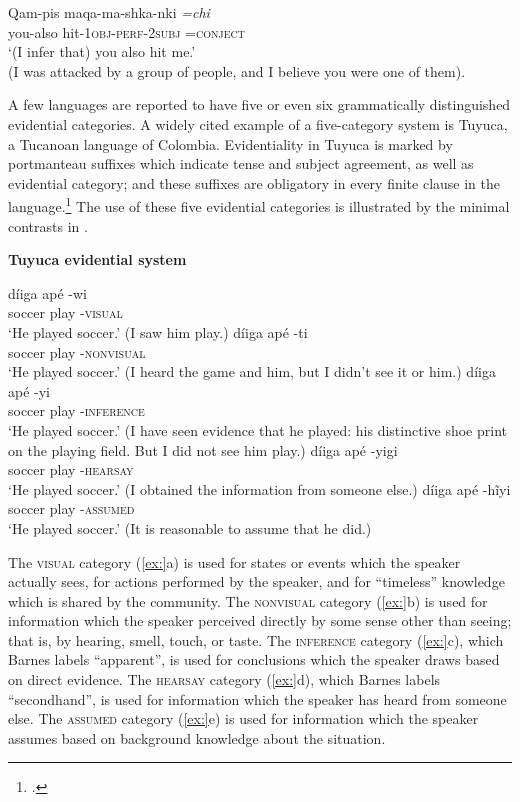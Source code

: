  \ex \gll Qam-pis  maqa-ma-shka-nki  \textit{=chi}\\
you-also  hit-1\textsc{obj}-\textsc{perf-2subj  =conject}\\
\glt ‘(I infer that) you also hit me.’\\
(I was attacked by a group of people, and I believe you were one of them).
\z \z


A few languages are reported to have five or even six grammatically distinguished evidential categories. A widely cited example of a five-category system is Tuyuca, a Tucanoan language of Colombia. Evidentiality in Tuyuca is marked by portmanteau suffixes which indicate tense and subject agreement, as well as evidential category; and these suffixes are obligatory in every finite clause in the language.\footnote{\citet{Barnes1984}.} The use of these five evidential categories is illustrated by the minimal contrasts in .


\textbf{Tuyuca evidential system} \citep{Barnes1984}

\ea
\ea \gll  díiga  apé  -wi  \\
soccer  play  -\textsc{visual}\\
\glt ‘He played soccer.’ (I saw him play.)
\ex \gll díiga  apé  -ti\\
soccer  play  -\textsc{nonvisual}\\
\glt ‘He played soccer.’ (I heard the game and him, but I didn’t see it or him.)
\ex \gll  díiga  apé  -yi\\
soccer  play  -\textsc{inference}\\
\glt ‘He played soccer.’ (I have seen evidence that he played: his distinctive shoe print on the playing field. But I did not see him play.)
\ex \gll  díiga  apé  -yigi\\
soccer  play  -\textsc{hearsay}\\
\glt ‘He played soccer.’ (I obtained the information from someone else.)
\ex \gll  díiga  apé  -hĩyi\\
soccer  play  -\textsc{assumed}\\
\glt ‘He played soccer.’ (It is reasonable to assume that he did.)
\z \z


The \textsc{visual} category (\ref{ex:}a) is used for states or events which the speaker actually sees, for actions performed by the speaker, and for “timeless” knowledge which is shared by the community. The \textsc{nonvisual} category (\ref{ex:}b) is used for information which the speaker perceived directly by some sense other than seeing; that is, by hearing, smell, touch, or taste. The \textsc{inference} category (\ref{ex:}c), which Barnes labels “apparent”, is used for conclusions which the speaker draws based on direct evidence. The \textsc{hearsay} category (\ref{ex:}d), which Barnes labels “secondhand”, is used for information which the speaker has heard from someone else. The \textsc{assumed} category (\ref{ex:}e) is used for information which the speaker assumes based on background knowledge about the situation.


